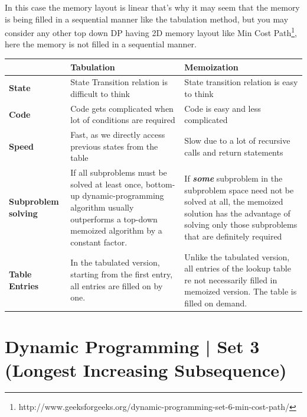 In this case the memory layout is linear that's why it may seem that the
memory is being filled in a sequential manner like the tabulation method,
but you may consider any other top down DP having 2D memory layout like Min
Cost
Path\footnote{http://www.geeksforgeeks.org/dynamic-programming-set-6-min-cost-path/},
here the memory is not filled in a sequential manner.

\begingroup
\renewcommand*{\arraystretch}{\arraystretchsize}
\begin{footnotesize}
\begin{longtable}{|p{2.5cm}|p{5.5cm}|p{5.5cm}|}
\hline
\endfirsthead
\hline
\endlastfoot
    &\textbf{Tabulation}&\textbf{Memoization}\\\hline
\textbf{State}&State Transition relation is difficult to think&State
transition relation is easy to think\\\hline
\textbf{Code} &Code gets complicated when lot of conditions are
required&Code is easy and less complicated\\\hline
\textbf{Speed}&Fast, as we directly access previous states from the
table&Slow due to a lot of recursive calls and return statements\\\hline
\textbf{Subproblem solving}&If all subproblems must be solved at least once,
bottom-up dynamic-programming algorithm usually outperforms a top-down
memoized algorithm by a constant factor.&If \textbf{\emph{some}} subproblem
in the subproblem space need not be solved at all, the memoized solution has
the advantage of solving only those subproblems that are definitely
required\\\hline
\textbf{Table Entries}&In the tabulated version, starting from the first
entry, all entries are filled on by one.& Unlike the tabulated version, all
entries of the lookup table re not necessarily filled in memoized version.
The table is filled on demand.
\end{longtable}
\end{footnotesize}
\endgroup



\section{Dynamic Programming | Set 3 (Longest Increasing Subsequence)
  \label{secGFGDPSet3LIS}}

